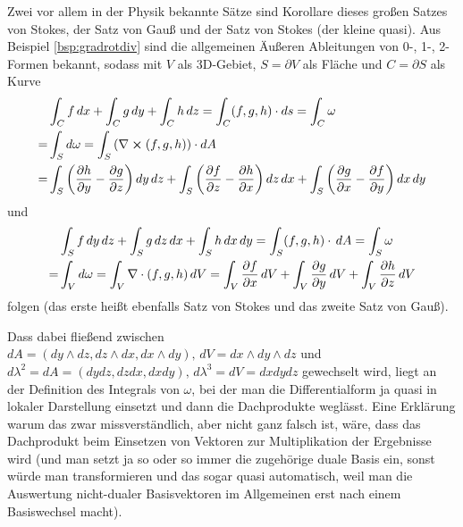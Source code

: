 \documentclass[../H_Analysis_main.tex]{subfiles}
\begin{document}
\begin{bsp}
Zwei vor allem in der Physik bekannte Sätze sind Korollare dieses großen Satzes von Stokes, der Satz von Gauß und der Satz von Stokes (der kleine quasi). Aus Beispiel \ref{bsp:gradrotdiv} sind die allgemeinen Äußeren Ableitungen von 0-, 1-, 2-Formen bekannt, sodass mit $V$ als 3D-Gebiet, $S = \partial V$ als Fläche und $C = \partial S$ als Kurve
\begin{equation}
\begin{split}
&\int_C f \, dx + \int_C g \, dy + \int_C h \, dz = \int_C (f, g, h) \cdot ds = \int_C \omega
\\
= &\int_S d\omega = \int_S \qty(\nabla \cross (f, g, h)) \cdot dA 
\\
= &\int_S \qty(\pdv{h}{y} - \pdv{g}{z}) \, dy \, dz + \int_S \qty(\pdv{f}{z} - \pdv{h}{x}) \, dz \, dx + \int_S \qty(\pdv{g}{x} - \pdv{f}{y}) \, dx \, dy
\end{split}
\end{equation}
und
\begin{equation}
\begin{split}
&\int_S f \, dy \, dz + \int_S g \, dz \, dx + \int_S h \, dx \, dy = \int_S (f, g, h) \cdot \, dA = \int_S \omega
\\
= &\int_V d\omega = \int_V \nabla \cdot (f, g, h) \, dV = \int_V \pdv{f}{x} \, dV + \int_V \pdv{g}{y} \, dV + \int_V \pdv{h}{z} \, dV
\end{split}
\end{equation}
folgen (das erste heißt ebenfalls Satz von Stokes und das zweite Satz von Gauß).

Dass dabei fließend zwischen $dA = (dy \wedge dz, dz \wedge dx, dx \wedge dy), \, dV = dx \wedge dy \wedge dz$ und $d\lambda^2 = dA = (dy dz, dz dx, dx dy), \, d\lambda^3 = dV = dx dy dz$ gewechselt wird, liegt an der Definition des Integrals von $\omega$, bei der man die Differentialform ja quasi in lokaler Darstellung einsetzt und dann die Dachprodukte weglässt. Eine Erklärung warum das zwar missverständlich, aber nicht ganz falsch ist, wäre, dass das Dachprodukt beim Einsetzen von Vektoren zur Multiplikation der Ergebnisse wird (und man setzt ja so oder so immer die zugehörige duale Basis ein, sonst würde man transformieren und das sogar quasi automatisch, weil man die Auswertung nicht-dualer Basisvektoren im Allgemeinen erst nach einem Basiswechsel macht).
\end{bsp}
\end{document}
